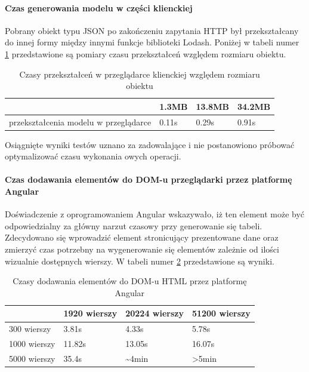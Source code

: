 \documentclass[a4paper,12pt,twoside]{article}
\begin{document}
\paragraph{Czas generowania modelu w części klienckiej} Pobrany obiekt typu JSON
po zakończeniu zapytania HTTP był przekształcany do innej formy między innymi
funkcje biblioteki Lodash. Poniżej w tabeli numer \ref{table:lodashTime} przedstawione są pomiary czasu przekształceń względem rozmiaru obiektu.

\begin{table} [H]
\begin{tabular}{| p{3cm} | p{3cm} | p{3cm} | p{3cm}|}
\hline
& 1.3MB&13.8MB& 34.2MB\\
\hline
przekształcenia modelu w przeglądarce& 0.11s & 0.29s& 0.91s\\ \hline
\end{tabular}
\caption{Czasy przekształceń w przeglądarce klienckiej względem rozmiaru obiektu}
\label{table:lodashTime}
\end{table}
Osiągnięte wyniki testów uznano za zadowalające i nie postanowiono
próbować optymalizować czasu wykonania owych operacji.

\paragraph{Czas dodawania elementów do DOM-u przeglądarki przez platformę Angular}
Doświadczenie z oprogramowaniem Angular wskazywało, iż ten element może być odpowiedzialny za główny narzut czasowy przy generowanie się tabeli.
Zdecydowano się wprowadzić element stronicujący prezentowane dane oraz
zmierzyć czas potrzebny na wygenerowanie się elementów zależnie od ilości
wizualnie dostępnych wierszy. W tabeli numer \ref{table:tableRender} przedstawione są
wyniki.

\begin{table} [H]
\begin{tabular}{| p{3cm} | p{3cm} | p{3cm} | p{3cm}|}
\hline
& 1920 wierszy & 20224 wierszy & 51200 wierszy\\
\hline
300 wierszy& 3.81s & 4.33s& 5.78s\\ \hline
1000 wierszy& 11.82s & 13.05s& 16.07s\\ \hline
5000 wierszy& 35.4s & \textasciitilde 4min& >5min\\ \hline
\end{tabular}
\caption{Czasy dodawania elementów do DOM-u HTML przez platformę Angular}
\label{table:tableRender}
\end{table}
\newpage
\end{document}
